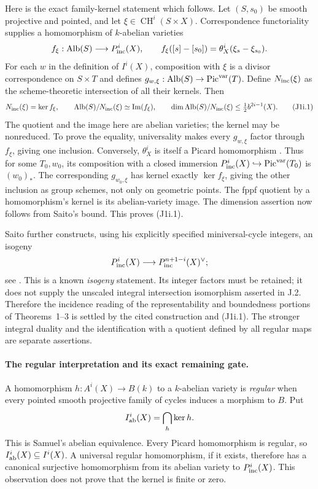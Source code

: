 Here is the exact family-kernel statement which follows. Let
$(S,s_0)$ be smooth projective and pointed, and let
$\xi\in\operatorname{CH}^i(S\times X)$. Correspondence
functoriality supplies a homomorphism of $k$-abelian varieties
\[
 f_\xi:\operatorname{Alb}(S)\longrightarrow P^i_{\rm inc}(X),
 \qquad
 f_\xi([s]-[s_0])=\theta_X^i(\xi_s-\xi_{s_0}).
\]
For each $w$ in the definition of $I^i(X)$, composition with
$\xi$ is a divisor correspondence on $S\times T$ and defines
$g_{w,\xi}:\operatorname{Alb}(S)\to\operatorname{Pic}^{\rm var}(T)$.
Define $N_{\rm inc}(\xi)$ as the scheme-theoretic intersection of
all their kernels. Then
\[
 N_{\rm inc}(\xi)=\ker f_\xi,
 \qquad
 \operatorname{Alb}(S)/N_{\rm inc}(\xi)
     \simeq\operatorname{Im}(f_\xi),
 \qquad
 \dim\operatorname{Alb}(S)/N_{\rm inc}(\xi)
       \leq\tfrac12 b^{2i-1}(X).                 \tag{J1i.1}
\]
The quotient and the image here are abelian varieties; the kernel
may be nonreduced. To prove the equality, universality makes every
$g_{w,\xi}$ factor through $f_\xi$, giving one inclusion.
Conversely, $\theta_X^i$ is itself a Picard homomorphism
\cite[(3.5), p.~110]{DGJ_Saito1979}. Thus for some $T_0,w_0$,
its composition with a closed immersion
$P^i_{\rm inc}(X)\hookrightarrow\operatorname{Pic}^{\rm var}(T_0)$
is $(w_0)_*$. The corresponding $g_{w_0,\xi}$ has kernel exactly
$\ker f_\xi$, giving the other inclusion as group schemes, not
only on geometric points. The fppf quotient by a homomorphism's
kernel is its abelian-variety image. The dimension assertion now
follows from Saito's bound. This proves (J1i.1).

Saito further constructs, using his explicitly specified
miniversal-cycle integers, an isogeny
\[
 P^i_{\rm inc}(X)\longrightarrow
          P^{n+1-i}_{\rm inc}(X)^\vee;
\]
see \cite[(4.1)--(4.2), p.~112; Proposition 4.4 and
Corollary 4.5, p.~113]{DGJ_Saito1979}. This is a known
\emph{isogeny} statement. Its integer factors must be retained;
it does not supply the unscaled integral intersection isomorphism
asserted in J.2. Therefore the incidence reading of the
representability and boundedness portions of Theorems~1--3 is
settled by the cited construction and (J1i.1). The stronger
integral duality and the identification with a quotient defined
by all regular maps are separate assertions.

\paragraph{The regular interpretation and its exact remaining gate.}
A homomorphism $h:A^i(X)\to B(k)$ to a $k$-abelian variety is
\emph{regular} when every pointed smooth projective family of
cycles induces a morphism to $B$. Put
\[
 I^i_{\rm ab}(X)=\bigcap_h\ker h.
\]
This is Samuel's abelian equivalence. Every Picard homomorphism is
regular, so
$I^i_{\rm ab}(X)\subseteq I^i(X)$. A universal regular
homomorphism, if it exists, therefore has a canonical surjective
homomorphism from its abelian variety to $P^i_{\rm inc}(X)$.
This observation does not prove that the kernel is finite or zero.

